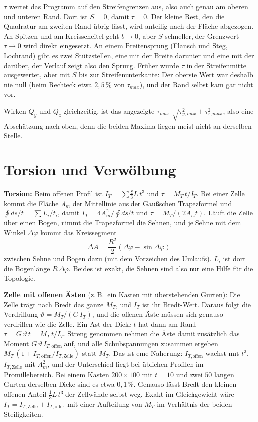 $\tau$ wertet das Programm auf den Streifengrenzen aus, also auch genau am oberen und unteren Rand.
Dort ist $S = 0$, damit $\tau = 0$. Der kleine Rest, den die Quadratur am zweiten Rand übrig lässt,
wird anteilig nach der Fläche abgezogen. An Spitzen und am Kreisscheitel geht $b \to 0$, aber $S$
schneller, der Grenzwert $\tau \to 0$ wird direkt eingesetzt. An einem Breitensprung (Flansch und
Steg, Lochrand) gibt es zwei Stützstellen, eine mit der Breite darunter und eine mit der darüber,
der Verlauf zeigt also den Sprung. Früher wurde $\tau$ in der Streifenmitte ausgewertet, aber mit
$S$ bis zur Streifenunterkante: Der oberste Wert war deshalb nie null (beim Rechteck etwa
$2{,}5\,\%$ von $\tau_{max}$), und der Rand selbst kam gar nicht vor.

Wirken $Q_y$ und $Q_z$ gleichzeitig, ist das angezeigte $\tau_{max}$
$\sqrt{\tau_{y,max}^2 + \tau_{z,max}^2}$, also eine Abschätzung nach oben, denn die beiden Maxima
liegen meist nicht an derselben Stelle.

\section{Torsion und Verwölbung}\label{sec:mathe-torsion}

\textbf{Torsion:} Beim offenen Profil ist $I_T = \sum \frac{\xi}{3} L\,t^3$ und
$\tau = M_T\,t/I_T$. Bei einer Zelle kommt die Fläche $A_m$ der Mittellinie aus der Gaußschen
Trapezformel und $\oint ds/t = \sum L_i/t_i$, damit $I_T = 4A_m^2/\oint ds/t$ und
$\tau = M_T/(2A_m t)$. Läuft die Zelle über einen Bogen, nimmt die Trapezformel die Sehnen, und je
Sehne mit dem Winkel $\Delta\varphi$ kommt das Kreissegment
\[
  \Delta A = \frac{R^2}{2}\left(\Delta\varphi - \sin\Delta\varphi\right)
\]
zwischen Sehne und Bogen dazu (mit dem Vorzeichen des Umlaufs). $L_i$ ist dort die Bogenlänge
$R\,\Delta\varphi$. Beides ist exakt, die Sehnen sind also nur eine Hilfe für die Topologie.

\textbf{Zelle mit offenen Ästen} (z.\,B.\ ein Kasten mit überstehenden Gurten): Die Zelle trägt
nach Bredt das ganze $M_T$, und $I_T$ ist ihr Bredt-Wert. Daraus folgt die Verdrillung
$\vartheta = M_T/(G\,I_T)$, und die offenen Äste müssen sich genauso verdrillen wie die Zelle. Ein
Ast der Dicke $t$ hat dann am Rand $\tau = G\,\vartheta\,t = M_T\,t/I_T$. Streng genommen nehmen die
Äste damit zusätzlich das Moment $G\,\vartheta\,I_{T,\text{offen}}$ auf, und alle Schubspannungen
zusammen ergeben $M_T\,(1 + I_{T,\text{offen}}/I_{T,\text{Zelle}})$ statt $M_T$. Das ist eine
Näherung: $I_{T,\text{offen}}$ wächst mit $t^3$, $I_{T,\text{Zelle}}$ mit $A_m^2$, und der
Unterschied liegt bei üblichen Profilen im Promillebereich. Bei einem Kasten $200 \times 100$ mit
$t = 10$ und zwei $50$ langen Gurten derselben Dicke sind es etwa $0{,}1\,\%$. Genauso lässt Bredt
den kleinen offenen Anteil $\frac13 L\,t^3$ der Zellwände selbst weg. Exakt im Gleichgewicht wäre
$I_T = I_{T,\text{Zelle}} + I_{T,\text{offen}}$ mit einer Aufteilung von $M_T$ im Verhältnis der
beiden Steifigkeiten.


